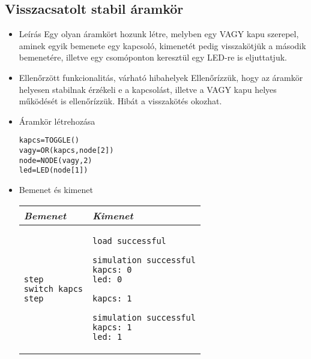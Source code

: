 \subsection{Visszacsatolt stabil áramkör}
\begin{itemize}
\item Leírás\newline
Egy olyan áramkört hozunk létre, melyben egy VAGY kapu szerepel, aminek egyik bemenete egy kapcsoló, kimenetét pedig visszakötjük a második bemenetére, illetve egy csomóponton keresztül egy LED-re is eljuttatjuk.
\item Ellenőrzött funkcionalitás, várható hibahelyek\newline
Ellenőrízzük, hogy az áramkör helyesen stabilnak érzékeli e a kapcsolást, illetve a VAGY kapu helyes működését is ellenőrízzük. Hibát a visszakötés okozhat.

\item Áramkör létrehozása

\begin{verbatim}
kapcs=TOGGLE()
vagy=OR(kapcs,node[2])
node=NODE(vagy,2)
led=LED(node[1])
\end{verbatim}

\item Bemenet és kimenet\newline

\begin{tabular}{|p{7cm}|p{7cm}|} 
\hline 
\textit{Bemenet} & \textit{Kimenet} \\ \hline
\begin{verbatim}
step
switch kapcs
step
\end{verbatim}
& 
\begin{verbatim}
load successful

simulation successful
kapcs: 0
led: 0

kapcs: 1

simulation successful
kapcs: 1
led: 1
\end{verbatim}
\\ \hline
\end{tabular}

\end{itemize}


